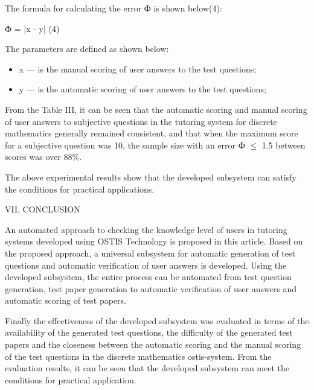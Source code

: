 \documentclass{article}
\begin{document}
\begin{multicols}{2}
\begin{table}[H]
\begin{center}
\begin{tabular}{|p{1cm}|p{1cm}|p{1cm}|p{1cm}|p{1cm}|p{0.7cm}|p{1.1cm}|}
\hline
\end{tabular}
\end{center}
\end{table}

The formula for calculating the error Ф is shown below(4):

\vspace{-0.2cm}
\begin{center}
Ф = |x - y| \hspace{3cm} (4)
\end{center}

The parameters are defined as shown below:
\begin{itemize}
    \item x — is the manual scoring of user answers to the test questions;

    \item y — is the automatic scoring of user answers to the test questions;
\end{itemize}

From the Table III, it can be seen that the automatic scoring and manual scoring of user answers to subjective questions in the tutoring system for discrete mathematics generally remained consistent, and that when the maximum score for a subjective question was 10, the sample size with an error Ф $\leq$ 1.5 between scores was over 88\%.

The above experimental results show that the developed subsystem can satisfy the conditions for practical applications.
 \begin{center}
    VII. CONCLUSION
\end{center}

An automated approach to checking the knowledge level of users in tutoring systems developed using OSTIS Technology is proposed in this article. Based on the proposed approach, a universal subsystem for automatic generation of test questions and automatic verification of user answers is developed. Using the developed subsystem, the entire process can be automated from test question generation, test paper generation to automatic verification of user answers and automatic scoring of test papers.

Finally the effectiveness of the developed subsystem was evaluated in terms of the availability of the generated test questions, the difficulty of the generated test papers and the closeness between the automatic scoring and the manual scoring of the test questions in the discrete mathematics ostis-system. From the evaluation results, it can be seen that the developed subsystem can meet the conditions for practical application.


\end{multicols}
\end{document}
